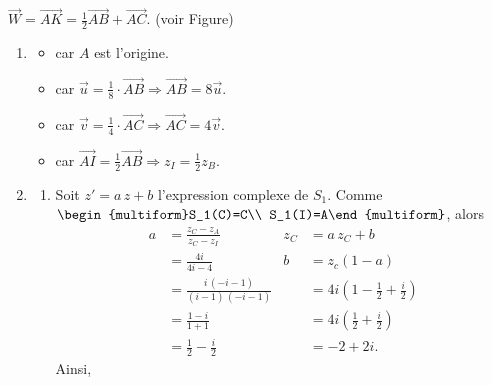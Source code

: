 \begin{description}
\begin{enumerate}
							$\overrightarrow{W} = \overrightarrow{AK} = \frac{1}{2} \overrightarrow{AB} + \overrightarrow{AC}$.
							(voir Figure)
			\end{enumerate}
				\item[Partie B]
					\begin{enumerate}
						\item {}
							\begin{itemize}
								\item {} car $A$ est l'origine.
								\item {} car 
									$\vec{u} = \frac{1}{8} \cdot \overrightarrow{AB} \Rightarrow \overrightarrow{AB} = 8 \vec{u}$.
								\item {} car 
									$\vec{v} = \frac{1}{4} \cdot \overrightarrow{AC} \Rightarrow \overrightarrow{AC} = 4 \vec{v}$.
								\item {} car 
									$\overrightarrow{AI} = \frac{1}{2} \overrightarrow{AB} \Rightarrow z_I = \frac{1}{2} z_B$.
							\end{itemize}
						\item \begin{enumerate}
									\item {}
												Soit $z' = a\, z + b$ l'expression complexe de $S_1$.
												Comme 
												$\begin{multiform}S_1(C)=C\\ S_1(I)=A\end{multiform}$, 
												alors
												\begin{align*}
												a	& = \frac{z_C - z_A}{z_C - z_I}		& z_C & = a \, z_C + b 		\\
													& = \frac{4i}{4i - 4}						& b 	& = z_c ( 1 - a)		\\
													& = \frac{i\,(-i-1)}{(i-1)\,(-i-1)}	&  		& = 4i\left(1-\frac{1}{2}+\frac{i}{2}\right) \\
													& = \frac{1-i}{1+1}						&   	& = 4i\left(\frac{1}{2}+\frac{i}{2}\right)	\\
													& = \frac{1}{2} - \frac{i}{2}			&  		& = -2 + 2i 				.
												\end{align*}
												Ainsi, 
												

\end{enumerate}
\end{enumerate}
\end{description}
